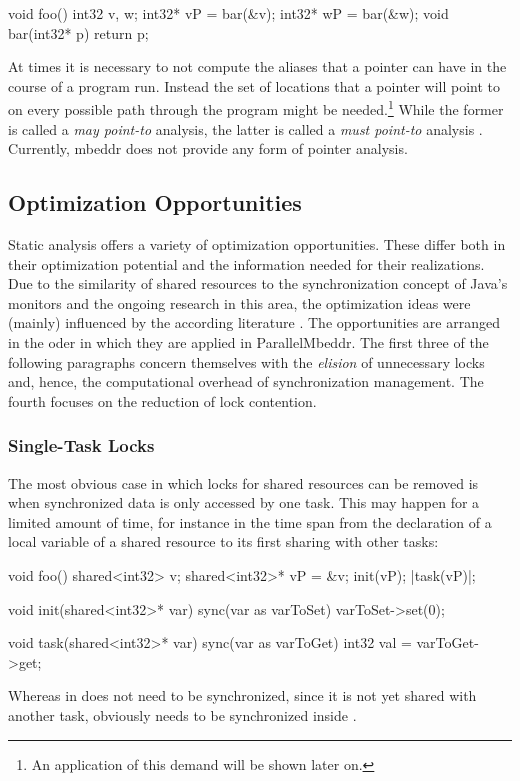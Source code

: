 \begin{ccode}
void foo() {
  int32 v, w;
  int32* vP = bar(&v);
  int32* wP = bar(&w);
}
void bar(int32* p) {
  return p;
}
\end{ccode}
At times it is necessary to not compute the aliases that a pointer can have in the course of a program run. Instead the set of locations that a pointer will point to on every possible path through the program might be needed.\footnote{An application of this demand will be shown later on.} While the former is called a \textit{may point-to} analysis, the latter is called a \textit{must point-to} analysis \cite{ProgramAnalysisAndSpecialization}.
Currently, mbeddr does not provide any form of pointer analysis.

\subsection{Optimization Opportunities}
Static analysis offers a variety of optimization opportunities. These differ both in their optimization potential and the information needed for their realizations. Due to the similarity of shared resources to the synchronization concept of Java's monitors and the ongoing research in this area, the optimization ideas were (mainly) influenced by the according literature \cite{StaticAnalysesForJava}\cite{JavaTheoryAndPractice}\cite{DoJava6Threading}. The opportunities are arranged in the oder in which they are applied in ParallelMbeddr. The first three of the following paragraphs concern themselves with the \textit{elision} of unnecessary locks and, hence, the computational overhead of synchronization management. The fourth focuses on the reduction of lock contention.

\subsubsection{Single-Task Locks}
The most obvious case in which locks for shared resources can be removed is when synchronized data is only accessed by one task. This may happen for a limited amount of time, for instance in the time span from the declaration of a local variable of a shared resource to its first sharing with other tasks:
\begin{ccode}
void foo() {
  shared<int32> v;
  shared<int32>* vP = &v;
  init(vP);
  |task(vP)|;
}

void init(shared<int32>* var) {
  sync(var as varToSet) {
    varToSet->set(0);
  }
}

void task(shared<int32>* var) {
  sync(var as varToGet) {
    int32 val = varToGet->get;
  }
}
\end{ccode}
Whereas  in  does not need to be synchronized, since it is not yet shared with another task,  obviously needs to be synchronized inside .


